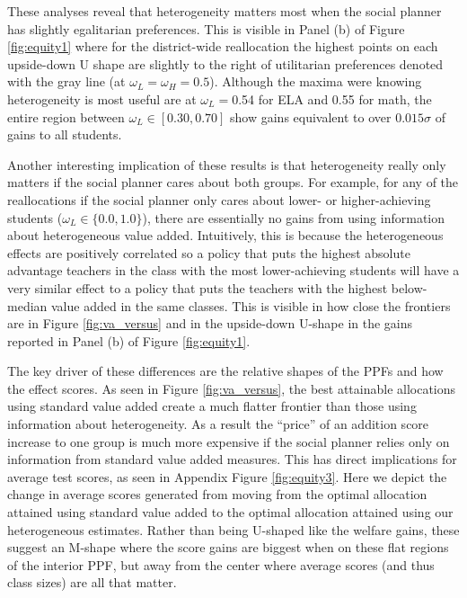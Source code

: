 \documentclass[12pt]{article}
\theoremstyle{definition}
\theoremstyle{definition}
\theoremstyle{definition}
\theoremstyle{definition}
\begin{document}
These analyses reveal that heterogeneity matters most when the social planner has slightly egalitarian preferences. This is visible in Panel (b) of Figure \ref{fig:equity1} where for the district-wide reallocation the highest points on each upside-down U shape are slightly to the right of utilitarian preferences denoted with the gray line (at $\omega_L=\omega_H=0.5$). Although the maxima were knowing heterogeneity is most useful are at $\omega_L=$0.54 for ELA and 0.55 for math, the entire region between $\omega_L\in[0.30,0.70]$ show gains equivalent to over $0.015\sigma$ of gains to all students. 


Another interesting implication of these results is that heterogeneity really only matters if the social planner cares about both groups. For example, for any of the reallocations if the social planner only cares about lower- or higher-achieving students ($\omega_L\in\{0.0,1.0\}$), there are essentially no gains from using information about heterogeneous value added. Intuitively, this is because the heterogeneous effects are positively correlated so a policy that puts the highest absolute advantage teachers in the class with the most lower-achieving students will have a very similar effect to a policy that puts the teachers with the highest below-median value added in the same classes. This is visible in how close the frontiers are in Figure \ref{fig:va_versus} and in the upside-down U-shape in the gains reported in Panel (b) of Figure \ref{fig:equity1}.


The key driver of these differences are the relative shapes of the PPFs and how the effect scores. As seen in Figure \ref{fig:va_versus}, the best attainable allocations using standard value added create a much flatter frontier than those using information about heterogeneity. As a result the ``price'' of an addition score increase to one group is much more expensive if the social planner relies only on information from standard value added measures. This has direct implications for average test scores, as seen in Appendix Figure \ref{fig:equity3}. Here we depict the change in average scores generated from moving from the optimal allocation attained using standard value added to the optimal allocation attained using our heterogeneous estimates. Rather than being U-shaped like the welfare gains, these suggest an M-shape where the score gains are biggest when on these flat regions of the interior PPF, but away from the center where average scores (and thus class sizes) are all that matter.
\end{document}

